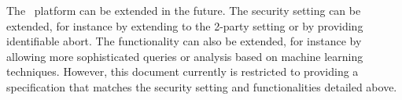 The \SLCompute~platform can be extended in the future.
The security setting can be extended, for instance by extending to the 2-party setting
or by providing identifiable abort.
The functionality can also be extended, for instance by allowing more sophisticated
queries or analysis based on machine learning techniques.
However, this document currently is restricted to providing a specification that
matches the security setting and functionalities detailed above.
